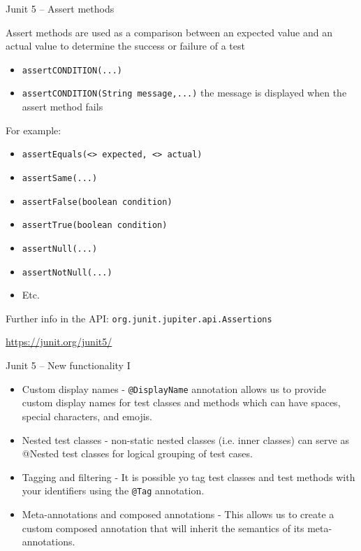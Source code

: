 \documentclass[11pt, xcolor=svgnames]{beamer}
\begin{document}

\begin{frame}{Junit 5 -- Assert methods}

Assert methods are used as a comparison between an expected value and an actual value to determine the success or failure of a test
  
      \begin{itemize}
        \item \texttt{assertCONDITION(...)}
        \item \texttt{assertCONDITION(String message,...)}  the message is displayed when the assert method fails
      \end{itemize}
  
For example:
      \begin{itemize}
        \item \texttt{assertEquals(<> expected, <> actual)}
        \item \texttt{assertSame(...)} 
        \item \texttt{assertFalse(boolean condition)}
        \item \texttt{assertTrue(boolean condition)}
        \item \texttt{assertNull(...)}
        \item \texttt{assertNotNull(...)}
        \item Etc.
      \end{itemize}

Further info in the API: \texttt{org.junit.jupiter.api.Assertions}

\url{https://junit.org/junit5/}
  
\end{frame}


\begin{frame}{Junit 5 -- New functionality I}

\begin{itemize}
  \item Custom display names - \texttt{@DisplayName} annotation allows us to provide custom display names for test classes and methods which can have spaces, special characters, and emojis.

  \item Nested test classes - non-static nested classes (i.e. inner classes) can serve as @Nested test classes for logical grouping of test cases. 

  \item Tagging and filtering - It is possible yo tag test classes and test methods with your  identifiers using the \texttt{@Tag} annotation. 

  \item Meta-annotations and composed annotations - This allows us to create a custom composed annotation that will inherit the semantics of its meta-annotations.

\end{itemize}

\end{frame}
\end{document}
